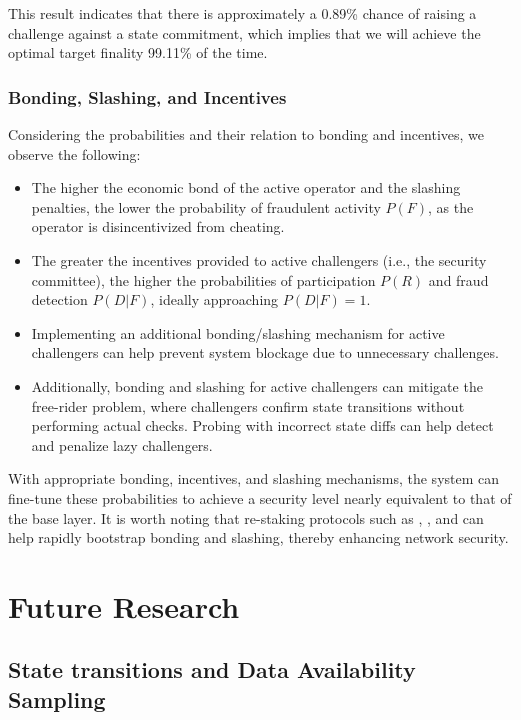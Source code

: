 \documentclass{article}
\begin{document}
\vspace{1em}

This result indicates that there is approximately a 0.89\% chance of raising a challenge against a state commitment, which implies that we will achieve the optimal target finality 99.11\% of the time.

\subsubsection{Bonding, Slashing, and Incentives}

Considering the probabilities and their relation to bonding and incentives, we observe the following:

\begin{itemize}
    \item The higher the economic bond of the active operator and the slashing penalties, the lower the probability of fraudulent activity \( P(F) \), as the operator is disincentivized from cheating.
    \item The greater the incentives provided to active challengers (i.e., the security committee), the higher the probabilities of participation \( P(R) \) and fraud detection \( P(D|F) \), ideally approaching \( P(D|F) = 1 \).
    \item Implementing an additional bonding/slashing mechanism for active challengers can help prevent system blockage due to unnecessary challenges.
    \item Additionally, bonding and slashing for active challengers can mitigate the free-rider problem, where challengers confirm state transitions without performing actual checks. Probing with incorrect state diffs can help detect and penalize lazy challengers.
\end{itemize}

With appropriate bonding, incentives, and slashing mechanisms, the system can fine-tune these probabilities to achieve a security level nearly equivalent to that of the base layer. It is worth noting that re-staking protocols such as \cite{jitorestaking2023}, \cite{solayer2023}, and \cite{picasso2024} can help rapidly bootstrap bonding and slashing, thereby enhancing network security.

\section{Future Research}

\subsection{State transitions and Data Availability Sampling }
\end{document}
